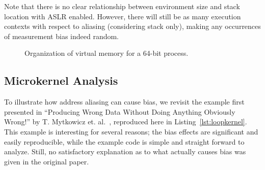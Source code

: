\documentclass[a4paper,10pt,twocolumn,twoside]{article}
\begin{document}
Note that there is no clear relationship between environment size and stack location with ASLR enabled.
However, there will still be as many execution contexts with respect to aliasing (considering stack only), making any occurrences of measurement bias indeed random.

\begin{figure}[float=t]
  \caption{Organization of virtual memory for a 64-bit process.}
  \label{fig:virtualmemory}
\end{figure}

\subsection{Microkernel Analysis}
To illustrate how address aliasing can cause bias, we revisit the example first presented in ``Producing Wrong Data Without Doing Anything Obviously Wrong!'' by T. Mytkowicz et. al.~\cite{Mytkowicz:2009:WrongData}, reproduced here in Listing~\ref{lst:loopkernel}. 
This example is interesting for several reasons; the bias effects are significant and easily reproducible, while the example code is simple and straight forward to analyze.
Still, no satisfactory explanation as to what actually causes bias was given in the original paper.
\end{document}
